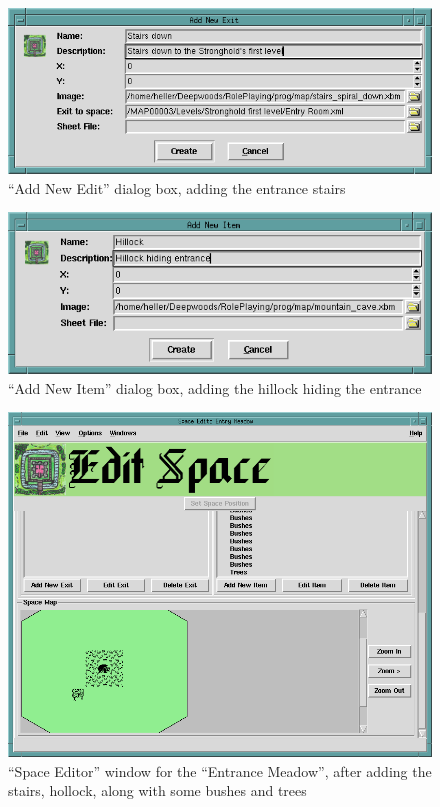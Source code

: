 \begin{figure}[hbpt]
\begin{centering}
\includegraphics[width=5in]{CreatingStairsDown.png}
\caption{``Add New Edit'' dialog box, adding the entrance stairs}
\label{fig:addnewexit}
\end{centering}
\end{figure}
\begin{figure}[hbpt]
\begin{centering}
\includegraphics[width=5in]{CreatingHillock.png}
\caption{``Add New Item'' dialog box, adding the hillock hiding the entrance}
\label{fig:addnewitem}
\end{centering}
\end{figure}
\begin{figure}[hbpt]
\begin{centering}
\includegraphics[width=5in]{UpdatedSpaceWithStairsHillockBushesTrees.png}
\caption{``Space Editor'' window for the ``Entrance Meadow'', after
adding the stairs, hollock, along with some bushes and trees}
\label{fig:entrymeadowspaceeditor2}
\end{centering}
\end{figure}
